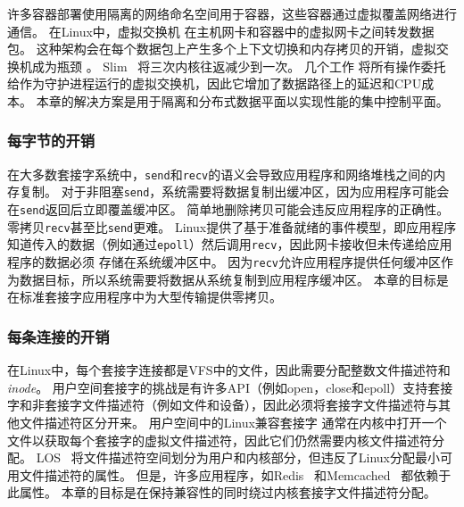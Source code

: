 许多容器部署使用隔离的网络命名空间用于容器，这些容器通过虚拟覆盖网络进行通信。
在Linux中，虚拟交换机 \cite {pfaff2015design}在主机网卡和容器中的虚拟网卡之间转发数据包。
这种架构会在每个数据包上产生多个上下文切换和内存拷贝的开销，虚拟交换机成为瓶颈 \cite {pfefferle2015hybrid}。
Slim~ \cite {slim}将三次内核往返减少到一次。
几个工作 \cite {martins2014clickos,roghanchi2017ffwd,huang2017high,nsdi19freeflow}将所有操作委托给作为守护进程运行的虚拟交换机，因此它增加了数据路径上的延迟和CPU成本。
本章的解决方案是用于隔离和分布式数据平面以实现性能的集中控制平面。


\subsubsection{每字节的开销}
\label{socksdirect:subsec:per-byte-overhead}

在大多数套接字系统中，\texttt {send}和\texttt {recv}的语义会导致应用程序和网络堆栈之间的内存复制。 对于非阻塞\texttt {send}，系统需要将数据复制出缓冲区，因为应用程序可能会在\texttt {send}返回后立即覆盖缓冲区。 简单地删除拷贝可能会违反应用程序的正确性。
零拷贝\texttt {recv}甚至比\texttt {send}更难。
Linux提供了基于准备就绪的事件模型，即应用程序知道传入的数据（例如通过\texttt {epoll}）然后调用\texttt {recv}，因此网卡接收但未传递给应用程序的数据必须 存储在系统缓冲区中。
因为\texttt {recv}允许应用程序提供任何缓冲区作为数据目标，所以系统需要将数据从系统复制到应用程序缓冲区。
本章的目标是在标准套接字应用程序中为大型传输提供零拷贝。



\subsubsection{每条连接的开销}
\label{socksdirect:subsec:per-connection-overhead}

在Linux中，每个套接字连接都是VFS中的文件，因此需要分配整数文件描述符和\emph {inode}。
用户空间套接字的挑战是有许多API（例如open，close和epoll）支持套接字和非套接字文件描述符（例如文件和设备），因此必须将套接字文件描述符与其他文件描述符区分开来。
用户空间中的Linux兼容套接字 \cite {libvma,rsockets}通常在内核中打开一个文件以获取每个套接字的虚拟文件描述符，因此它们仍然需要内核文件描述符分配。
LOS~ \cite {huang2017high}将文件描述符空间划分为用户和内核部分，但违反了Linux分配最小可用文件描述符的属性。
但是，许多应用程序，如Redis~ \cite {redis}和Memcached~ \cite {memcached}都依赖于此属性。
本章的目标是在保持兼容性的同时绕过内核套接字文件描述符分配。

